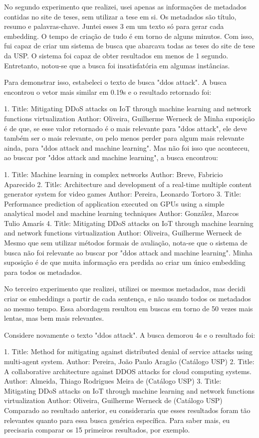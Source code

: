 \documentclass[
	12pt,				%
	openright,			%
	oneside,			%
	a4paper,			%
	english,			%
	french,				%
	spanish,			%
	brazil				%
	]{abntex2}
\begin{document}
No segundo experimento que realizei, usei apenas as informações de metadados contidas no site de teses, sem utilizar a tese em si. Os metadados são título, resumo e palavras-chave. Juntei esses 3 em um texto só para gerar cada embedding. O tempo de criação de tudo é em torno de alguns minutos. Com isso, fui capaz de criar um sistema de busca que abarcava todas as teses do site de tese da USP. O sistema foi capaz de obter resultados em menos de 1 segundo. Entretanto, notou-se que a busca foi insatisfatória em algumas instâncias.

Para demonstrar isso, estabeleci o texto de busca "ddos attack". A busca encontrou o vetor mais similar em 0.19s e o resultado retornado foi:

1. Title:  Mitigating DDoS attacks on IoT through machine learning and network functions virtualization
Author:  Oliveira, Guilherme Werneck de
Minha suposição é de que, se esse valor retornado é o mais relevante para "ddos attack", ele deve também ser o mais relevante, ou pelo menos perder para algum mais relevante ainda, para "ddos attack and machine learning". Mas não foi isso que aconteceu, ao buscar por "ddos attack and machine learning", a busca encontrou:

1. Title:  Machine learning in complex networks
Author:  Breve, Fabricio Aparecido
2. Title:  Architecture and development of a real-time multiple content generator system for video games
Author:  Pereira, Leonardo Tortoro
3. Title:  Performance prediction of application executed on GPUs using a simple analytical model and machine learning techniques
Author:  González, Marcos Tulio Amarís
4. Title:  Mitigating DDoS attacks on IoT through machine learning and network functions virtualization
Author:  Oliveira, Guilherme Werneck de
Mesmo que sem utilizar métodos formais de avaliação, nota-se que o sistema de busca não foi relevante ao buscar por "ddos attack and machine learning". Minha suposição é de que muita informação era perdida ao criar um único embedding para todos os metadados.

No terceiro experimento que realizei, utilizei os mesmos metadados, mas decidi criar os embeddings a partir de cada sentença, e não usando todos os metadados ao mesmo tempo. Essa abordagem resultou em buscas em torno de 50 vezes mais lentas, mas bem mais relevantes.

Considere novamente o texto "ddos attack". A busca demorou 4s e o resultado foi:

1. Title:  Method for mitigating against distributed denial of service attacks using multi-agent system.
Author:  Pereira, João Paulo Aragão (Catálogo USP)
2. Title:  A collaborative architecture against DDOS attacks for cloud computing systems.
Author:  Almeida, Thiago Rodrigues Meira de (Catálogo USP)
3. Title:  Mitigating DDoS attacks on IoT through machine learning and network functions virtualization
Author:  Oliveira, Guilherme Werneck de (Catálogo USP)
Comparado ao resultado anterior, eu consideraria que esses resultados foram tão relevantes quanto para essa busca genérica específica. Para saber mais, eu precisaria comparar os 15 primeiros resultados, por exemplo.
\end{document}
